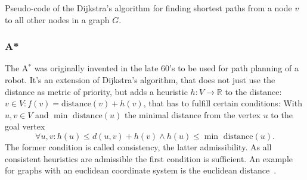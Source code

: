             \begin{algorithm}[htp]
                \hrulealg
            \caption{Pseudo-code of the Dijkstra's algorithm for finding shortest paths from a node $v$ to all other nodes in a graph $G$.}\label{dijkstra}
            \end{algorithm}
        
        
        \subsubsection*{A*}
            The A$^*$ was originally invented in the late 60's to be used for path planning of a robot. 
            It's an extension of Dijkstra's algorithm, that does not just use the distance as metric of priority, but adds a heuristic $h: V \rightarrow \mathbb{R}$ to the distance: 
            $v \in V: f(v) = \text{distance}(v) + h(v)$, that has to fulfill certain conditions:
            With $u,v \in V$ and $\min\text{ distance}(u)$ the minimal distance from the  vertex $u$ to the goal vertex
            \[ \forall u,v: h(u) \leq d(u, v) + h(v) \wedge h(u) \leq \min\text{ distance}(u).
            \]
            The former condition is called consistency, the latter admissibility. 
            As all consistent heuristics are admissible the first condition is sufficient.
            An example for graphs with an euclidean coordinate system is the euclidean distance~\autocite{hart1968formal}.
            
